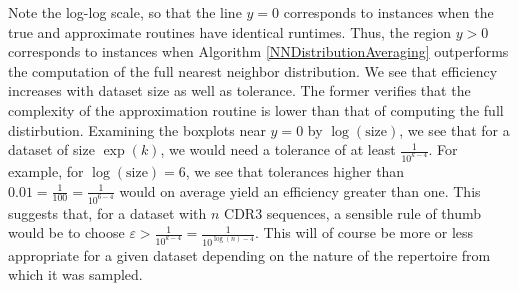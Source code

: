 \documentclass{article}
\begin{document}
Note the log-log scale, so that the line $y=0$ corresponds to instances when the true and approximate routines have identical runtimes.
Thus, the region $y > 0$ corresponds to instances when Algorithm \ref{NNDistributionAveraging} outperforms the computation of the full nearest neighbor distribution.
We see that efficiency increases with dataset size as well as tolerance.
The former verifies that the complexity of the approximation routine is lower than that of computing the full distirbution.
Examining the boxplots near $y = 0$ by $\log(\text{size})$, we see that for a dataset of size $\exp(k)$, we would need a tolerance of at least $\frac{1}{10^{k - 4}}$.
For example, for $\log(\text{size}) = 6$, we see that tolerances higher than $0.01 = \frac{1}{100} = \frac{1}{10^{6 - 4}}$ would on average yield an efficiency greater than one.
This suggests that, for a dataset with $n$ CDR3 sequences, a sensible rule of thumb would be to choose $\varepsilon > \frac{1}{10^{k - 4}} = \frac{1}{10^{\log(n) - 4}}$.
This will of course be more or less appropriate for a given dataset depending on the nature of the repertoire from which it was sampled.
\end{document}
